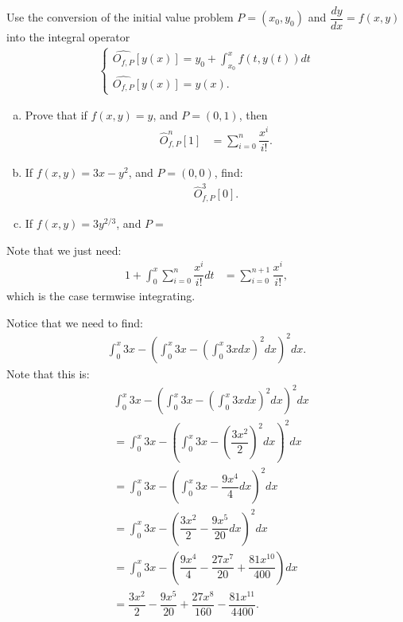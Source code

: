 \documentclass{article}
\begin{document}
\begin{problem}[Problem 5]
    Use the conversion of the initial value problem $P =(x_0, y_0)$ and $\dfrac{dy}{dx} = f(x,y)$ into the integral operator
    \begin{align}
        \begin{cases}
            \hat{O_{f,P}}[y(x)] = y_0 + \int_{x_0}^{x} f(t,y(t)) dt  \\ 
            \hat{O_{f,P}}[y(x)] = y(x).
        \end{cases}
    \end{align}
    \begin{enumerate}[(a)]
        \item Prove that if $f(x,y) = y$, and $P = (0,1)$, then 
        \begin{align*}
            \hat{O}_{f,P}^n[1] &= \sum_{i=0}^n \dfrac{x^i}{i!}.
        \end{align*}
        \item If $f(x,y) = 3x - y^2$, and $P= (0,0)$, find:
        \begin{align*}
            \hat{O}_{f,P}^3[0].
        \end{align*}
        \item If $f(x,y) = 3y^{2/3}$, and $P = $
    \end{enumerate}
\end{problem}
\begin{solution}[Problem 5a]
    Note that we just need:
    \begin{align*}
        1 + \int_{0}^{x} \sum_{i=0}^{n} \dfrac{x^i}{i!} dt &= \sum_{i=0}^{n+1} \dfrac{x^i}{i!},
    \end{align*}
    which is the case termwise integrating.
\end{solution}
\begin{solution}[Problem 5b]
    Notice that we need to find:
    \begin{align*}
        \int_0^x 3x - \left(\int_0^x 3x - \left(\int_0^x 3x dx \right)^2 dx \right)^2 dx.
    \end{align*}
    Note that this is:
    \begin{align*}
        &\int_0^x 3x - \left(\int_0^x 3x - \left(\int_0^x 3x dx \right)^2 dx \right)^2 dx \\ 
        &= \int_0^x 3x - \left(\int_0^x 3x - \left(\dfrac{3x^2}{2} \right)^2 dx \right)^2 dx \\ 
        &= \int_0^x 3x - \left(\int_0^x 3x - \dfrac{9x^4}{4} dx \right)^2 dx \\ 
        &= \int_0^x 3x - \left(\dfrac{3x^2}{2} - \dfrac{9x^5}{20} dx \right)^2 dx \\
        &= \int_0^x 3x - \left(\dfrac{9x^{4}}{4}-\dfrac{27x^{7}}{20}+\dfrac{81x^{10}}{400}\right) dx \\
        &= \dfrac{3x^2}{2} - \dfrac{9x^5}{20} + \dfrac{27x^8}{160} - \dfrac{81x^{11}}{4400}. 
    \end{align*}
\end{solution}
\end{document}
